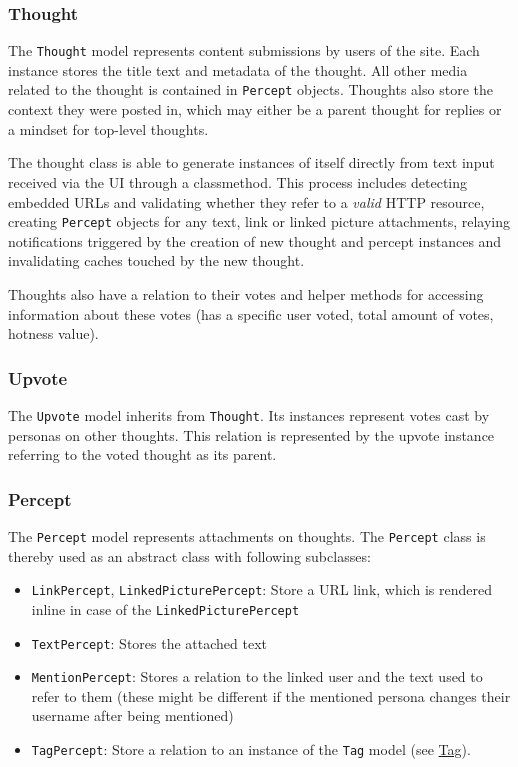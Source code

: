 \subsubsection{Thought}\label{thought}

The \texttt{Thought} model represents content submissions by users of
the site. Each instance stores the title text and metadata of the
thought. All other media related to the thought is contained in
\texttt{Percept} objects. Thoughts also store the context they were
posted in, which may either be a parent thought for replies or a mindset
for top-level thoughts.

The thought class is able to generate instances of itself directly from
text input received via the UI through a classmethod. This process
includes detecting embedded URLs and validating whether they refer to a
\emph{valid} HTTP resource, creating \texttt{Percept} objects for any
text, link or linked picture attachments, relaying notifications
triggered by the creation of new thought and percept instances and
invalidating caches touched by the new thought.

Thoughts also have a relation to their votes and helper methods for
accessing information about these votes (has a specific user voted,
total amount of votes, hotness value).

\subsubsection{Upvote}\label{upvote}

The \texttt{Upvote} model inherits from \texttt{Thought}. Its instances
represent votes cast by personas on other thoughts. This relation is
represented by the upvote instance referring to the voted thought as its
parent.

\subsubsection{Percept}\label{percept}

The \texttt{Percept} model represents attachments on thoughts. The
\texttt{Percept} class is thereby used as an abstract class with
following subclasses:

\begin{itemize}
\tightlist
\item
  \texttt{LinkPercept}, \texttt{LinkedPicturePercept}: Store a URL link,
  which is rendered inline in case of the \texttt{LinkedPicturePercept}
\item
  \texttt{TextPercept}: Stores the attached text
\item
  \texttt{MentionPercept}: Stores a relation to the linked user and the
  text used to refer to them (these might be different if the mentioned
  persona changes their username after being mentioned)
\item
  \texttt{TagPercept}: Store a relation to an instance of the
  \texttt{Tag} model (see \hyperref[tag]{Tag}).
\end{itemize}

